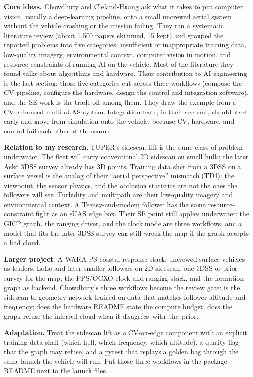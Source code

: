 \documentclass[11pt,a4paper,twocolumn]{amsart}
\begin{document}
\textbf{Core ideas.} Chowdhury and Cleland-Huang ask what it takes to put computer vision, usually a deep-learning pipeline, onto a small uncrewed aerial system without the vehicle crashing or the mission failing. They ran a systematic literature review (about 1{,}500 papers skimmed, 15 kept) and grouped the reported problems into five categories: insufficient or inappropriate training data, low-quality imagery, environmental context, computer vision in motion, and resource constraints of running AI on the vehicle. Most of the literature they found talks about algorithms and hardware. Their contribution to AI engineering is the last section: those five categories cut across three workflows (compose the CV pipeline, configure the hardware, design the control and integration software), and the SE work is the trade-off among them. They draw the example from a CV-enhanced multi-sUAS system. Integration tests, in their account, should start early and move from simulation onto the vehicle, because CV, hardware, and control fail each other at the seams.

\textbf{Relation to my research.} TUPER's sidescan lift is the same class of problem underwater. The fleet will carry conventional 2D sidescan on small hulls; the later Ask\"{o} 3DSS survey already has 3D points. Training data shot from a 3DSS on a surface vessel is the analog of their ``aerial perspective'' mismatch (TD1): the viewpoint, the sensor physics, and the occlusion statistics are not the ones the followers will see. Turbidity and multipath are their low-quality imagery and environmental context. A Teensy-and-modem follower has the same resource-constraint fight as an sUAS edge box. Their SE point still applies underwater: the GICP graph, the ranging driver, and the clock mode are three workflows, and a model that fits the later 3DSS survey can still wreck the map if the graph accepts a bad cloud.

\textbf{Larger project.} A WARA-PS coastal-response stack: uncrewed surface vehicles as leaders, LoLo and later smaller followers on 2D sidescan, one 3DSS or prior survey for the map, the PPS/OCXO clock and ranging stack, and the formation graph as backend. Chowdhury's three workflows become the review gate: is the sidescan-to-geometry network trained on data that matches follower altitude and frequency; does the hardware README state the compute budget; does the graph refuse the inferred cloud when it \mbox{disagrees with the prior.}

\textbf{Adaptation.} Treat the sidescan lift as a CV-on-edge component with an explicit training-data shall (which hull, which frequency, which altitude), a quality flag that the graph may refuse, and a pytest that replays a golden bag through the same launch the vehicle will run. Put those three workflows in the package README next to the launch files.
\end{document}
